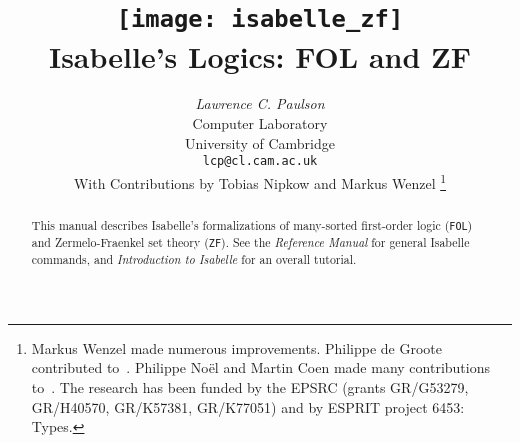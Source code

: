 \documentclass[11pt,a4paper]{report}
\title{\texttt{[image: isabelle\_zf]} \\[4ex] 
       Isabelle's Logics: FOL and ZF}
\author{{\em Lawrence C. Paulson}\\
        Computer Laboratory \\ University of Cambridge \\
        \texttt{lcp@cl.cam.ac.uk}\\[3ex] 
        With Contributions by Tobias Nipkow and Markus Wenzel%
\thanks{Markus Wenzel made numerous improvements.
    Philippe de Groote contributed to~\ZF{}.  Philippe No\"el and
    Martin Coen made many contributions to~\ZF{}.  The research has 
    been funded by the EPSRC (grants GR/G53279, GR/H40570, GR/K57381,
    GR/K77051) and by ESPRIT project 6453: Types.}
}
\begin{document}
\maketitle 

\begin{abstract}
This manual describes Isabelle's formalizations of many-sorted first-order
logic (\texttt{FOL}) and Zermelo-Fraenkel set theory (\texttt{ZF}).  See the
\emph{Reference Manual} for general Isabelle commands, and \emph{Introduction
  to Isabelle} for an overall tutorial.
\end{abstract}

 \tableofcontents \clearfirst






\end{document}
